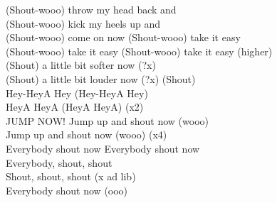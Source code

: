 (Shout-wooo) throw my head back and\\
(Shout-wooo) kick my heels up and\\
(Shout-wooo) come on now (Shout-wooo) take it easy\\
(Shout-wooo) take it easy (Shout-wooo) take it easy (higher)\\
(Shout) a little bit softer now (?x)\\
(Shout) a little bit louder now (?x) (Shout)\\
Hey-HeyA Hey (Hey-HeyA Hey)\\ HeyA HeyA  (HeyA HeyA) (x2) \\
JUMP NOW! Jump up and shout now (wooo)\\
Jump up and shout now (wooo) (x4)\\ 
Everybody shout now Everybody shout now\\
Everybody, shout, shout\\
Shout, shout, shout (x ad lib)\\
Everybody shout now (ooo)\\
